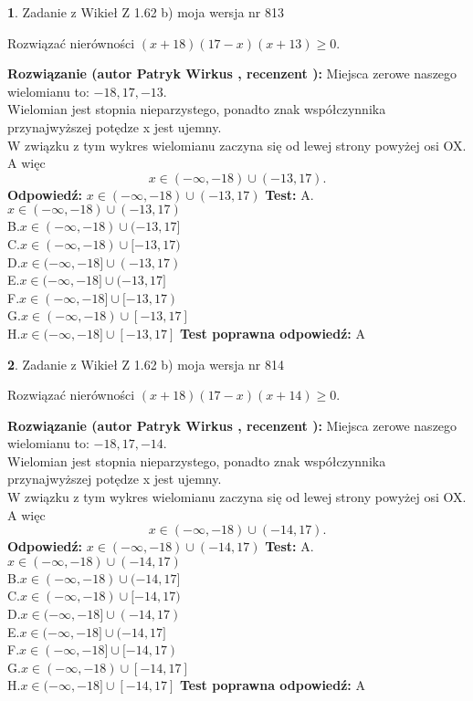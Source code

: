 \documentclass[12pt, a4paper]{article}
\theoremstyle{definition} %
\newtheorem{zad}{}
\newcommand{\zadStart}[1]{\begin{zad}#1\newline}
\newcommand{\zadStop}{\end{zad}}
\newcommand{\rozwStart}[2]{\noindent \textbf{Rozwiązanie (autor #1 , recenzent #2): }\newline}
\newcommand{\rozwStop}{\newline}
\newcommand{\odpStart}{\noindent \textbf{Odpowiedź:}\newline}
\newcommand{\odpStop}{\newline}
\newcommand{\testStart}{\noindent \textbf{Test:}\newline}
\newcommand{\testStop}{\newline}
\newcommand{\kluczStart}{\noindent \textbf{Test poprawna odpowiedź:}\newline}
\newcommand{\kluczStop}{\newline}
\begin{document}
\zadStart{Zadanie z Wikieł Z 1.62 b) moja wersja nr 813}

Rozwiązać nierówności $(x+18)(17-x)(x+13)\ge0$.
\zadStop
\rozwStart{Patryk Wirkus}{}
Miejsca zerowe naszego wielomianu to: $-18, 17, -13$.\\
Wielomian jest stopnia nieparzystego, ponadto znak współczynnika przy\linebreak najwyższej potędze x jest ujemny.\\ W związku z tym wykres wielomianu zaczyna się od lewej strony powyżej osi OX. A więc $$x \in (-\infty,-18) \cup (-13,17).$$
\rozwStop
\odpStart
$x \in (-\infty,-18) \cup (-13,17)$
\odpStop
\testStart
A.$x \in (-\infty,-18) \cup (-13,17)$\\
B.$x \in (-\infty,-18) \cup (-13,17]$\\
C.$x \in (-\infty,-18) \cup [-13,17)$\\
D.$x \in (-\infty,-18] \cup (-13,17)$\\
E.$x \in (-\infty,-18] \cup (-13,17]$\\
F.$x \in (-\infty,-18] \cup [-13,17)$\\
G.$x \in (-\infty,-18) \cup [-13,17]$\\
H.$x \in (-\infty,-18] \cup [-13,17]$
\testStop
\kluczStart
A
\kluczStop



\zadStart{Zadanie z Wikieł Z 1.62 b) moja wersja nr 814}

Rozwiązać nierówności $(x+18)(17-x)(x+14)\ge0$.
\zadStop
\rozwStart{Patryk Wirkus}{}
Miejsca zerowe naszego wielomianu to: $-18, 17, -14$.\\
Wielomian jest stopnia nieparzystego, ponadto znak współczynnika przy\linebreak najwyższej potędze x jest ujemny.\\ W związku z tym wykres wielomianu zaczyna się od lewej strony powyżej osi OX. A więc $$x \in (-\infty,-18) \cup (-14,17).$$
\rozwStop
\odpStart
$x \in (-\infty,-18) \cup (-14,17)$
\odpStop
\testStart
A.$x \in (-\infty,-18) \cup (-14,17)$\\
B.$x \in (-\infty,-18) \cup (-14,17]$\\
C.$x \in (-\infty,-18) \cup [-14,17)$\\
D.$x \in (-\infty,-18] \cup (-14,17)$\\
E.$x \in (-\infty,-18] \cup (-14,17]$\\
F.$x \in (-\infty,-18] \cup [-14,17)$\\
G.$x \in (-\infty,-18) \cup [-14,17]$\\
H.$x \in (-\infty,-18] \cup [-14,17]$
\testStop
\kluczStart
A
\kluczStop
\end{document}
